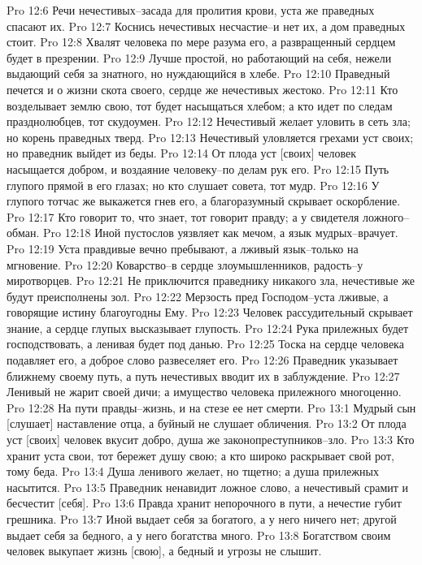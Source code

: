 Pro 12:6  Речи нечестивых--засада для пролития крови, уста же праведных спасают их.
Pro 12:7  Коснись нечестивых несчастие--и нет их, а дом праведных стоит.
Pro 12:8  Хвалят человека по мере разума его, а развращенный сердцем будет в презрении.
Pro 12:9  Лучше простой, но работающий на себя, нежели выдающий себя за знатного, но нуждающийся в хлебе.
Pro 12:10  Праведный печется и о жизни скота своего, сердце же нечестивых жестоко.
Pro 12:11  Кто возделывает землю свою, тот будет насыщаться хлебом; а кто идет по следам празднолюбцев, тот скудоумен.
Pro 12:12  Нечестивый желает уловить в сеть зла; но корень праведных тверд.
Pro 12:13  Нечестивый уловляется грехами уст своих; но праведник выйдет из беды.
Pro 12:14  От плода уст [своих] человек насыщается добром, и воздаяние человеку--по делам рук его.
Pro 12:15  Путь глупого прямой в его глазах; но кто слушает совета, тот мудр.
Pro 12:16  У глупого тотчас же выкажется гнев его, а благоразумный скрывает оскорбление.
Pro 12:17  Кто говорит то, что знает, тот говорит правду; а у свидетеля ложного--обман.
Pro 12:18  Иной пустослов уязвляет как мечом, а язык мудрых--врачует.
Pro 12:19  Уста правдивые вечно пребывают, а лживый язык--только на мгновение.
Pro 12:20  Коварство--в сердце злоумышленников, радость--у миротворцев.
Pro 12:21  Не приключится праведнику никакого зла, нечестивые же будут преисполнены зол.
Pro 12:22  Мерзость пред Господом--уста лживые, а говорящие истину благоугодны Ему.
Pro 12:23  Человек рассудительный скрывает знание, а сердце глупых высказывает глупость.
Pro 12:24  Рука прилежных будет господствовать, а ленивая будет под данью.
Pro 12:25  Тоска на сердце человека подавляет его, а доброе слово развеселяет его.
Pro 12:26  Праведник указывает ближнему своему путь, а путь нечестивых вводит их в заблуждение.
Pro 12:27  Ленивый не жарит своей дичи; а имущество человека прилежного многоценно.
Pro 12:28  На пути правды--жизнь, и на стезе ее нет смерти.
Pro 13:1  Мудрый сын [слушает] наставление отца, а буйный не слушает обличения.
Pro 13:2  От плода уст [своих] человек вкусит добро, душа же законопреступников--зло.
Pro 13:3  Кто хранит уста свои, тот бережет душу свою; а кто широко раскрывает свой рот, тому беда.
Pro 13:4  Душа ленивого желает, но тщетно; а душа прилежных насытится.
Pro 13:5  Праведник ненавидит ложное слово, а нечестивый срамит и бесчестит [себя].
Pro 13:6  Правда хранит непорочного в пути, а нечестие губит грешника.
Pro 13:7  Иной выдает себя за богатого, а у него ничего нет; другой выдает себя за бедного, а у него богатства много.
Pro 13:8  Богатством своим человек выкупает жизнь [свою], а бедный и угрозы не слышит.
